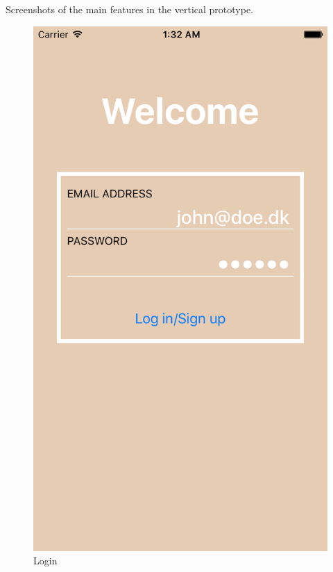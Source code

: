 Screenshots of the main features in the vertical prototype.

\begin{figure}[H]
\centering
  \begin{minipage}[b]{0.285\linewidth}
    \caption{Login}
    \includegraphics[width=\linewidth]{Appendix/VerticalPrototype/login.png}
  \end{minipage}
  \hspace{0.6cm}
  \begin{minipage}[b]{0.285\linewidth}

\end{minipage}
\end{figure}
